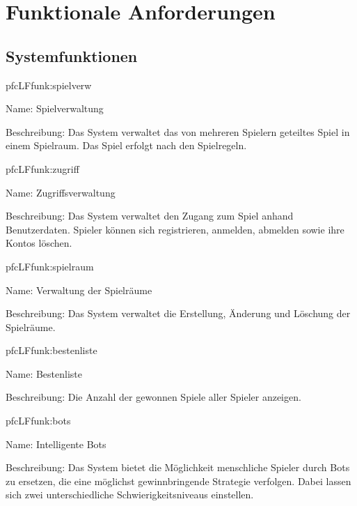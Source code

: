 \chapter{Funktionale Anforderungen}


\section{Systemfunktionen}

\setcounter{pfc}{10}

\begin{description}[leftmargin=5em, style=sameline]
	
	\begin{lhp}{pfc}{LF}{funk:spielverw}
		\item [Name:] Spielverwaltung
		\item [Beschreibung:] Das System verwaltet das von mehreren Spielern geteiltes Spiel in einem Spielraum. Das Spiel erfolgt nach den Spielregeln.
	\end{lhp}
	
	\begin{lhp}{pfc}{LF}{funk:zugriff}
		\item [Name:] Zugriffsverwaltung
		\item [Beschreibung:] Das System verwaltet den Zugang zum Spiel anhand Benutzerdaten. Spieler können sich registrieren, anmelden, abmelden sowie ihre Kontos löschen.
	\end{lhp}

	\begin{lhp}{pfc}{LF}{funk:spielraum}
		\item [Name:] Verwaltung der Spielräume
		\item [Beschreibung:] Das System verwaltet die Erstellung, Änderung und Löschung der Spielräume.
	\end{lhp}
	
	\begin{lhp}{pfc}{LF}{funk:bestenliste}
		\item [Name:] Bestenliste
		\item [Beschreibung:] Die Anzahl der gewonnen Spiele aller Spieler anzeigen.
	\end{lhp}
	
	\begin{lhp}{pfc}{LF}{funk:bots}
		\item [Name:] Intelligente Bots
		\item [Beschreibung:]
		Das System bietet die Möglichkeit menschliche Spieler durch Bots zu ersetzen, die eine möglichst gewinnbringende Strategie verfolgen. Dabei lassen sich zwei unterschiedliche Schwierigkeitsniveaus einstellen.
	\end{lhp}
	

\end{description}
